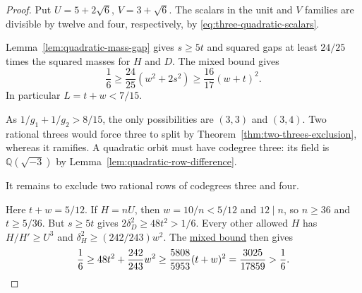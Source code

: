 \documentclass[11pt,reqno]{amsart}
\newcommand{\codecheck}[2]{\href{https://github.com/sebastienpalcoux/grothendieck-ring-classification/blob/d5750105bb5758f3ad38d2e5464dfcc12c019816/supplements/rank6/sphericality/#1}{#2}}
\theoremstyle{remark}\newtheorem{remark}[theorem]{Remark}
\numberwithin{equation}{section}
\begin{document}
\begin{proof}
Put $U=5+2\sqrt6$, $V=3+\sqrt6$. The scalars in the unit and
$V$ families are divisible by twelve and four, respectively,
by \eqref{eq:three-quadratic-scalars}.

Lemma~\ref{lem:quadratic-mass-gap} gives $s\ge5t$ and squared gaps
at least $24/25$ times the squared masses for $H$ and $D$. The mixed bound gives
\[
 \frac16\ge\frac{24}{25}(w^2+2s^2)
       \ge\frac{16}{17}(w+t)^2.
\]
In particular $L=t+w<7/15$.

As $1/g_1+1/g_2>8/15$, the only possibilities are $(3,3)$ and
$(3,4)$. Two rational threes would force three to split by
Theorem~\ref{thm:two-threes-exclusion}, whereas it ramifies.
A quadratic orbit must have codegree three: its field is
$\mathbb Q(\sqrt{-3})$ by Lemma~\ref{lem:quadratic-row-difference}.

It remains to exclude two rational rows of codegrees three and four.

Here $t+w=5/12$. If $H=nU$, then $w=10/n<5/12$ and $12\mid n$,
so $n\ge36$ and $t\ge5/36$. But $s\ge5t$ gives
$2\delta_D^2\ge48t^2>1/6$. Every other allowed $H$ has
$H/H'\ge U^3$ and $\delta_H^2\ge(242/243)w^2$.
The \codecheck{quadratic_24_28_checks/quadratic_twenty_four_rational_audit.py}{mixed bound}
then gives
\[
 \frac16\ge48t^2+\frac{242}{243}w^2
 \ge\frac{5808}{5953}(t+w)^2=\frac{3025}{17859}>\frac16.\qedhere
\]
\end{proof}
\end{document}
